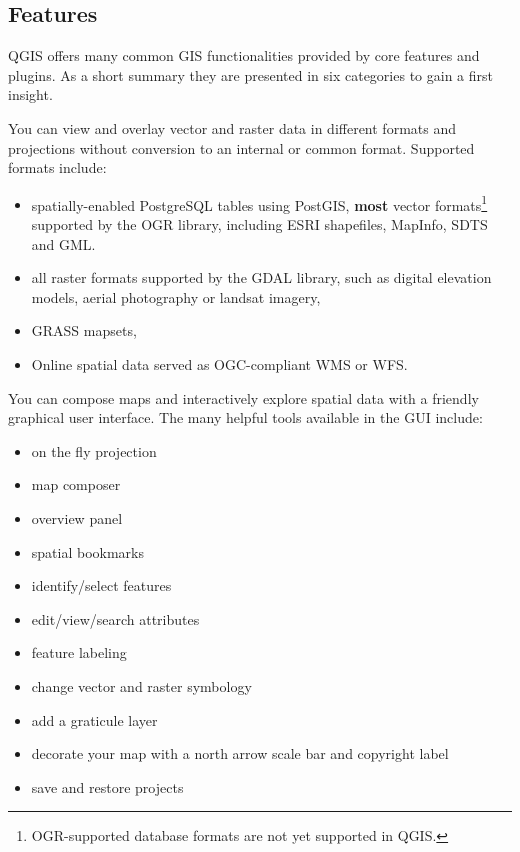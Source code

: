 \subsection{Features}\label{label_majfeat}

QGIS offers many common GIS functionalities provided by core features and
plugins. As a short summary they are presented in six categories to gain a
first insight.

You can view and overlay vector and raster data in different formats and
projections without conversion to an internal or common format. Supported
formats include:

\begin{itemize}
\item spatially-enabled PostgreSQL tables using PostGIS, \textbf{most} vector
formats\footnote{OGR-supported database formats are not yet supported in QGIS.}
supported by the OGR library, including ESRI shapefiles, MapInfo,
SDTS and GML.
\item all raster formats supported by the GDAL library, such as digital
elevation models, aerial photography or landsat imagery,
\item GRASS mapsets, 
\item Online spatial data served as OGC-compliant WMS or WFS.
\end{itemize}


You can compose maps and interactively explore spatial data with a friendly
graphical user interface. The many helpful tools available in the GUI include:

\begin{itemize}
\item on the fly projection
\item map composer
\item overview panel
\item spatial bookmarks
\item identify/select features
\item edit/view/search attributes
\item feature labeling
\item change vector and raster symbology
\item add a graticule layer
\item decorate your map with a north arrow scale bar and copyright label
\item save and restore projects
\end{itemize}

